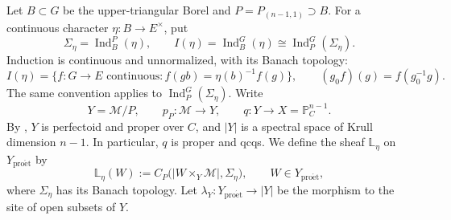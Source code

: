 \documentclass[11pt]{article}
\theoremstyle{definition}
\newcommand{\cM}{\mathcal M}
\newcommand{\Period}{\mathbb P_C^{n-1}}
\newcommand{\proet}{\mathrm{pro\acute et}}
\newcommand{\Ind}{\operatorname{Ind}}
\begin{document}
Let \(B\subset G\) be the upper-triangular Borel and
\(P=P_{(n-1,1)}\supset B\).  For a continuous character
\(\eta:B\to E^\times\), put
\begin{equation*}
 \Sigma_\eta=\Ind_B^P(\eta),\qquad
 I(\eta)=\Ind_B^G(\eta)\cong\Ind_P^G(\Sigma_\eta).
\end{equation*}
Induction is continuous and unnormalized, with its Banach topology:
\begin{equation*}
 I(\eta)=\{f:G\to E\text{ continuous}:f(gb)=\eta(b)^{-1}f(g)\},
 \qquad (g_0f)(g)=f(g_0^{-1}g).
\end{equation*}
The same convention applies to \(\Ind_P^G(\Sigma_\eta)\).
Write
\begin{equation*}
 Y=\cM/P,\qquad p_P:\cM\longrightarrow Y,\qquad
 q:Y\longrightarrow X=\Period.
\end{equation*}
By \cite[Theorem~A, Proposition~4.2.4 and Corollary~A.1.2]{JLH},
\(Y\) is perfectoid and proper over \(C\), and \(|Y|\) is a spectral space
of Krull dimension \(n-1\).  In particular, \(q\) is proper and qcqs.
We define the sheaf \(\mathbb L_\eta\) on \(Y_{\proet}\) by
\begin{equation*}
 \mathbb L_\eta(W):=C_P\bigl(|W\times_Y\cM|,\Sigma_\eta\bigr),
 \qquad W\in Y_{\proet},
\end{equation*}
where \(\Sigma_\eta\) has its Banach topology.
Let \(\lambda_Y:Y_{\proet}\to |Y|\) be the morphism to the
site of open subsets of \(Y\).
\end{document}
